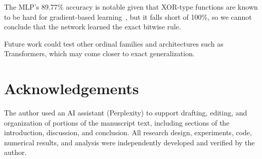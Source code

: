 \documentclass[11pt]{article}
\begin{document}
The MLP's 89.77\% accuracy is notable given that XOR-type functions are known to be hard for gradient-based learning~\cite{shalev2017failures}, but it falls short of 100\%, so we cannot conclude that the network learned the exact bitwise rule.

Future work could test other ordinal families and architectures such as Transformers, which may come closer to exact generalization.

\section*{Acknowledgements}
The author used an AI assistant (Perplexity) to support drafting, editing, and organization of portions of the manuscript text, including sections of the introduction, discussion, and conclusion. All research design, experiments, code, numerical results, and analysis were independently developed and verified by the author.




\end{document}
